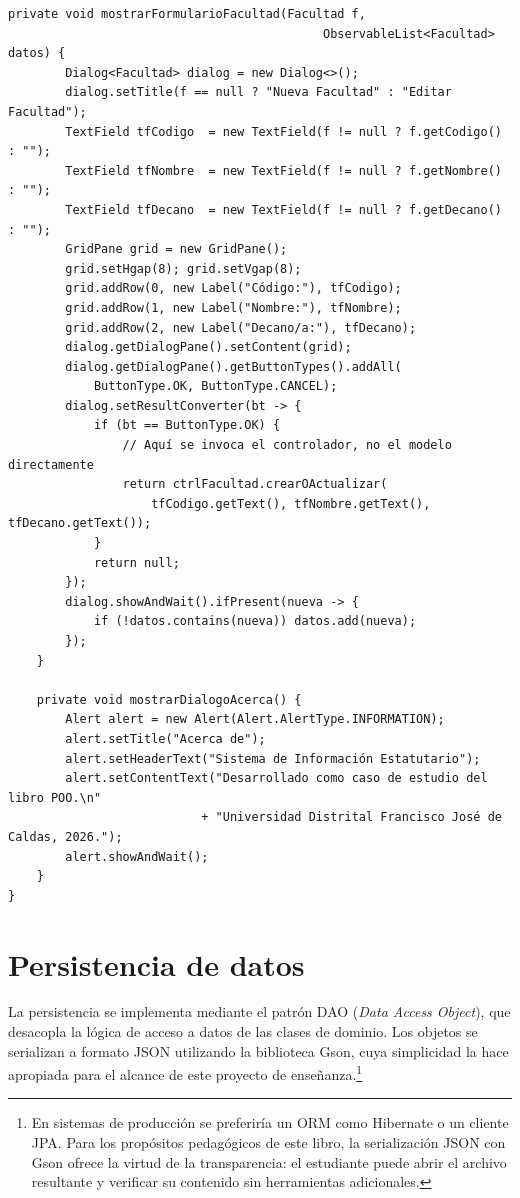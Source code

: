 \begin{lstlisting}[style=javaStyle, caption={Vista principal con JavaFX}, label={lst:javafx-vista}]
    private void mostrarFormularioFacultad(Facultad f,
                                            ObservableList<Facultad> datos) {
        Dialog<Facultad> dialog = new Dialog<>();
        dialog.setTitle(f == null ? "Nueva Facultad" : "Editar Facultad");
        TextField tfCodigo  = new TextField(f != null ? f.getCodigo()  : "");
        TextField tfNombre  = new TextField(f != null ? f.getNombre()  : "");
        TextField tfDecano  = new TextField(f != null ? f.getDecano()  : "");
        GridPane grid = new GridPane();
        grid.setHgap(8); grid.setVgap(8);
        grid.addRow(0, new Label("Código:"), tfCodigo);
        grid.addRow(1, new Label("Nombre:"), tfNombre);
        grid.addRow(2, new Label("Decano/a:"), tfDecano);
        dialog.getDialogPane().setContent(grid);
        dialog.getDialogPane().getButtonTypes().addAll(
            ButtonType.OK, ButtonType.CANCEL);
        dialog.setResultConverter(bt -> {
            if (bt == ButtonType.OK) {
                // Aquí se invoca el controlador, no el modelo directamente
                return ctrlFacultad.crearOActualizar(
                    tfCodigo.getText(), tfNombre.getText(), tfDecano.getText());
            }
            return null;
        });
        dialog.showAndWait().ifPresent(nueva -> {
            if (!datos.contains(nueva)) datos.add(nueva);
        });
    }

    private void mostrarDialogoAcerca() {
        Alert alert = new Alert(Alert.AlertType.INFORMATION);
        alert.setTitle("Acerca de");
        alert.setHeaderText("Sistema de Información Estatutario");
        alert.setContentText("Desarrollado como caso de estudio del libro POO.\n"
                           + "Universidad Distrital Francisco José de Caldas, 2026.");
        alert.showAndWait();
    }
}
\end{lstlisting}

\section{Persistencia de datos}
\label{sec:java-persistencia}

\noindent
La persistencia se implementa mediante el patrón DAO (\textit{Data Access Object}),
que desacopla la lógica de acceso a datos de las clases de dominio. Los objetos se
serializan a formato JSON utilizando la biblioteca Gson, cuya simplicidad la hace
apropiada para el alcance de este proyecto de enseñanza.\footnote{En sistemas de
producción se preferiría un ORM como Hibernate o un cliente JPA. Para los propósitos
pedagógicos de este libro, la serialización JSON con Gson ofrece la virtud de la
transparencia: el estudiante puede abrir el archivo resultante y verificar su contenido
sin herramientas adicionales.}

